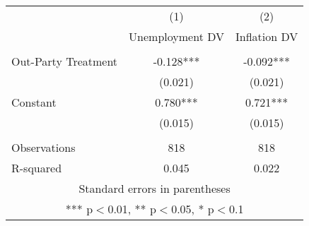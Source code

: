 \documentclass[]{article}
\begin{document}
\begin{tabular}{lcc} \hline
 & (1) & (2) \\
 & Unemployment DV & Inflation DV \\ \hline
 &  &  \\
Out-Party Treatment & -0.128*** & -0.092*** \\
 & (0.021) & (0.021) \\
Constant & 0.780*** & 0.721*** \\
 & (0.015) & (0.015) \\
 &  &  \\
Observations & 818 & 818 \\
 R-squared & 0.045 & 0.022 \\ \hline
\multicolumn{3}{c}{ Standard errors in parentheses} \\
\multicolumn{3}{c}{ *** p$<$0.01, ** p$<$0.05, * p$<$0.1} \\
\end{tabular}
\end{document}
